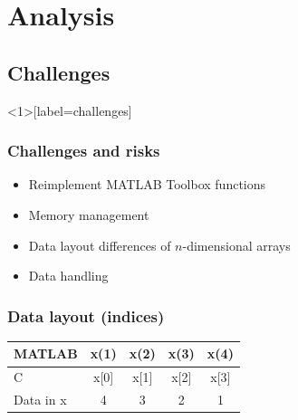\documentclass{beamer}
\begin{document}
\section{Analysis}

\subsection{Challenges}
\begin{frame}<1>[label=challenges]\frametitle{Challenges and risks}
\begin{itemize}
	\item<1> Reimplement MATLAB Toolbox functions
	\item<2> Memory management
	\item<3> Data layout differences of $n$-dimensional arrays
	\item<4> Data handling
\end{itemize}
\end{frame}

\begin{frame}\frametitle{Data layout (indices)}
	\centering
	\begin{tabular}{|l|c|c|c|c|}
	\hline
	MATLAB    & \cellcolor{langM} x(1) & \cellcolor{langM} x(2) & \cellcolor{langM} x(3) & \cellcolor{langM} x(4) \\ \hline
	C         & \cellcolor{langC} x[0] & \cellcolor{langC} x[1] & \cellcolor{langC} x[2] & \cellcolor{langC} x[3] \\ \hline
	Data in x & \cellcolor{data} 4     & \cellcolor{data} 3     & \cellcolor{data} 2     & \cellcolor{data} 1     \\ \hline
	\end{tabular}
\end{frame}
\end{document}
